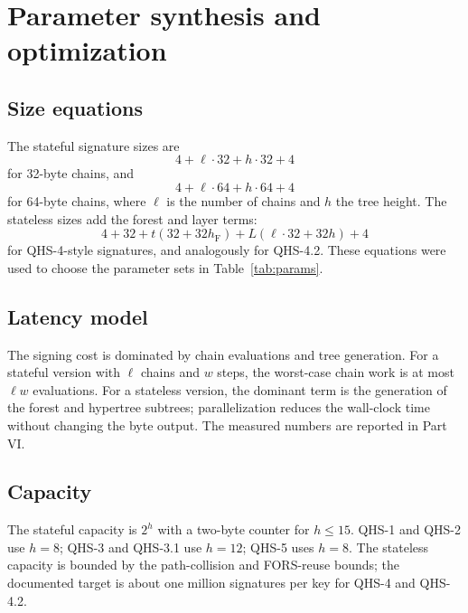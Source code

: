 \documentclass[11pt,a4paper]{article}
\theoremstyle{remark}
\begin{document}
\section{Parameter synthesis and optimization}

\subsection{Size equations}

The stateful signature sizes are
\[
4+\ell\cdot 32+h\cdot 32+4
\]
for 32-byte chains, and
\[
4+\ell\cdot 64+h\cdot 64+4
\]
for 64-byte chains, where \(\ell\) is the number of chains and \(h\) the tree
height. The stateless sizes add the forest and layer terms:
\[
4+32+t(32+32h_{\mathrm F})+L(\ell\cdot 32+32h)+4
\]
for QHS-4-style signatures, and analogously for QHS-4.2. These equations were
used to choose the parameter sets in Table~\ref{tab:params}.

\subsection{Latency model}

The signing cost is dominated by chain evaluations and tree generation. For a
stateful version with \(\ell\) chains and \(w\) steps, the worst-case chain work
is at most \(\ell w\) evaluations. For a stateless version, the dominant term is
the generation of the forest and hypertree subtrees; parallelization reduces
the wall-clock time without changing the byte output. The measured numbers are
reported in Part VI.

\subsection{Capacity}

The stateful capacity is \(2^h\) with a two-byte counter for \(h\le 15\). QHS-1
and QHS-2 use \(h=8\); QHS-3 and QHS-3.1 use \(h=12\); QHS-5 uses \(h=8\). The
stateless capacity is bounded by the path-collision and FORS-reuse bounds; the
documented target is about one million signatures per key for QHS-4 and
QHS-4.2.
\end{document}

